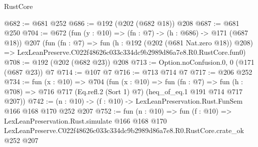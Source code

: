 \begin{lexlean}{RustCore}
\begin{coremodule}
@682 := @681 @252
@686 := @192 (@202 (@682 @18)) @208
@687 := @681 @250
@704 := @672
    (fun (y : @10) => (fn : @7) -> (h : @686) -> @171 (@687 @18))
    @207
    (fun (fn : @7) =>
    fun (h : @192 (@202 (@681 Nat.zero @18)) @208) =>
    LexLeanPreserve.C022f48626c033c334dc9b2989d86a7e8.R0.RustCore.fun0)
@708 := @192 (@202 (@682 @23)) @208
@713 := Option.noConfusion.{0, 0} (@171 (@687 @23)) @7
@714 := @107 @7
@716 := @713 @714 @7
@717 := @206 @252
@734 := fun (x : @10) =>
  @704
    (fun (x : @10) =>
    fun (fn : @7) =>
    fun (h : @708) => @716 @717 (Eq.refl.{2} (Sort 1) @7) (heq_of_eq.{1} @191 @714 @717 @207))
@742 := (n : @10) -> (f : @10) -> LexLeanPreservation.Rust.FunSem @166 @168 @170 @252 @207
@752 := fun (n : @10) =>
  fun (f : @10) =>
  LexLeanPreservation.Rust.simulate
    @166
    @168
    @170
    LexLeanPreserve.C022f48626c033c334dc9b2989d86a7e8.R0.RustCore.crate_ok
    @252
    @207
\end{coremodule}
\end{lexlean}
